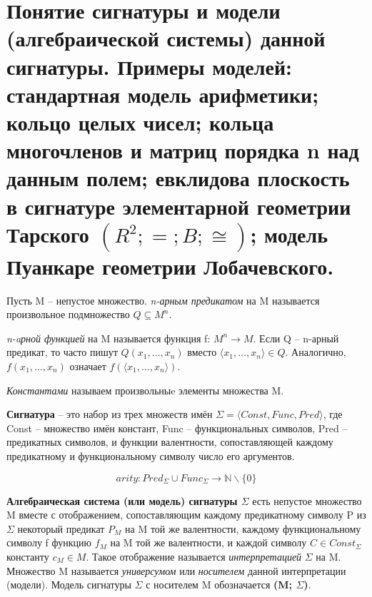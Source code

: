 \section{\texorpdfstring{Понятие сигнатуры и модели (алгебраической системы) данной сигнатуры. Примеры моделей:
стандартная модель арифметики; кольцо целых чисел; кольца многочленов и матриц порядка n над данным полем;
евклидова плоскость в сигнатуре элементарной геометрии Тарского $(R^{2}; =; B; \cong)$; модель Пуанкаре геометрии
Лобачевского.}{Понятие сигнатуры и модели данной сигнатуры. Примеры моделей.}}

\begin{definition}
	Пусть M -- непустое множество. \textit{n-арным предикатом} на M называется произвольное подмножество $Q
	\subseteq M^{n}$.

	\textit{n-aрной функцией} на M называется функция f: $M^{n}\to M$.
	Если Q -- n-арный предикат, то часто пишут $Q(x_1, \ldots , x_n)$ вместо $\langle x_1, \ldots , x_n \rangle \in
	Q$. Аналогично, $f(x_1, \ldots , x_n)$ означает $f (\langle x_1, \ldots , x_n \rangle)$.

	\textit{Константами} называем произвольныe элементы множества M.

	\textbf{Сигнатура} -- это набор из трех множеств имён $\varSigma =  \langle Const, Func, Pred \rangle $, где
	Const -- множество имён констант, Func -- функциональных символов, Pred -- предикатных символов, и функции
	валентности, сопоставляющей каждому предикатному и функциональному символу число его
	аргументов.$\label{formula2}$

	$$arity : Pred_\Sigma \cup Func_\Sigma \rightarrow \mathbb{N} \backslash\{0\}$$
\end{definition}

\begin{definition}
	\textbf{Алгебраическая система (или модель) сигнатуры $\varSigma $} есть непустое множество M вместе с
	отображением, сопоставляющим каждому предикатному символу P из $\varSigma $ некоторый предикат $P_{M}$ на M той же
	валентности, каждому функциональному символу f функцию $f_{M}$ на M той же валентности, и каждой символу $C \in
	Const_{\varSigma} $ константу $c_{M} \in M$. Такое отображение называется \textit{интерпретацией} $\varSigma $ на
	M. Множество M называется \textit{универсумом} или \textit{носителем} данной интерпретации (модели). Модель
	сигнатуры $\varSigma $ с носителем M обозначается \textbf{(M; $\varSigma$)}. $\label{formula3}$
\end{definition}

